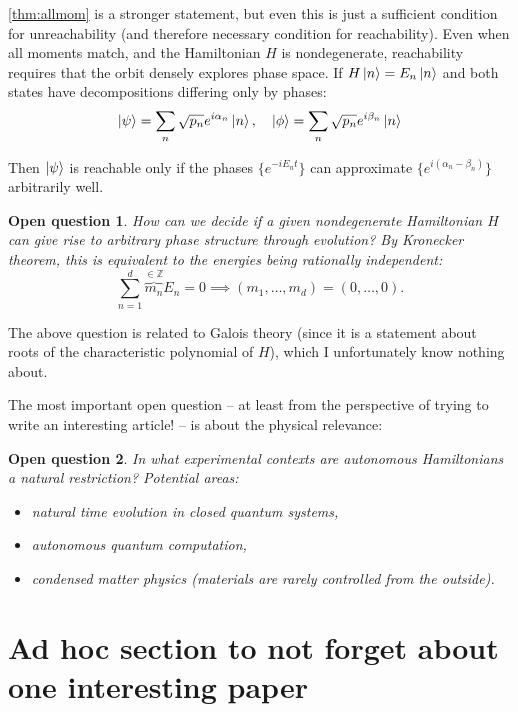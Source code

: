 \documentclass[ a4paper, 
                amsfonts, 
                amssymb, 
                amsmath, 
                reprint, 
                showkeys, 
                nofootinbib,
                superscriptaddress, 
                onecolumn, 
                notitlepage,
                aps,
                pra,
                longbibliography]{revtex4-1}
\newtheorem{oquestion}{Open question}
\theoremstyle{definition}
\begin{document}
\cref{thm:allmom} is a stronger statement, but even this is just a sufficient condition for unreachability (and therefore necessary condition for reachability). Even when all moments match, and the Hamiltonian $H$ is nondegenerate, reachability requires that the orbit densely explores phase space. If $H\ket{n} = E_n\ket{n}$ and both states have decompositions differing only by phases:
\begin{equation}
\ket{\psi} = \sum_n \sqrt{p_n} e^{i\alpha_n}\ket{n}, \quad \ket{\phi} = \sum_n \sqrt{p_n} e^{i\beta_n}\ket{n}\end{equation}

Then $\ket{\psi}$ is reachable only if the phases $\{e^{-iE_n t}\}$ can approximate $\{e^{i(\alpha_n-\beta_n)}\}$ arbitrarily well.
\begin{oquestion} How can we decide if a given nondegenerate Hamiltonian $H$ can give rise to arbitrary phase structure through evolution? By Kronecker theorem, this is equivalent to the energies being rationally independent:
\begin{equation}
\sum_{n=1}^d \overbrace{m_n}^{\in\mathbb{Z}} E_n = 0 \implies (m_1, \ldots, m_d) = (0,\ldots,0).
\end{equation}
\end{oquestion}
The above question is related to Galois theory (since it is a statement about roots of the characteristic polynomial of $H$), which I unfortunately know nothing about.

The most important open question -- at least from the perspective of trying to write an interesting article! -- is about the physical relevance:
\begin{oquestion}
In what experimental contexts are autonomous Hamiltonians a natural restriction? Potential areas:
   \begin{itemize}
   \item natural time evolution in closed quantum systems,
   \item autonomous quantum computation,
   \item condensed matter physics (materials are rarely controlled from the outside).
   \end{itemize}
\end{oquestion}

\section{Ad hoc section to not forget about one interesting paper}
\end{document}

